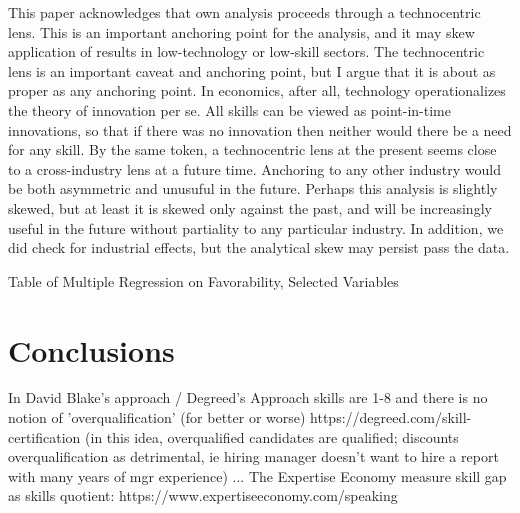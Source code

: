 \documentclass[review]{elsarticle}
\begin{document}
This paper acknowledges that own analysis proceeds through a technocentric lens.
This is an important anchoring point for the analysis, and it may skew application of results in low-technology or low-skill sectors.
The technocentric lens is an important caveat and anchoring point, but I argue that it is about as proper as any anchoring point.
In economics, after all, technology operationalizes the theory of innovation per se.
All skills can be viewed as point-in-time innovations, so that if there was no innovation then neither would there be a need for any skill.
By the same token, a technocentric lens at the present seems close to a cross-industry lens at a future time.
Anchoring to any other industry would be both asymmetric and unusuful in the future.
Perhaps this analysis is slightly skewed, but at least it is skewed only against the past, and will be increasingly useful in the future without partiality to any particular industry.
In addition, we did check for industrial effects, but the analytical skew may persist pass the data.



\begin{table}
    \caption{Table of Multiple Regression on Favorability, Selected Variables}
    \resizebox{\columnwidth}{!}{
        
    }
    \label{tab:table_new_ols}
\end{table}

\section{Conclusions}

In David Blake's approach / Degreed's Approach skills are 1-8 and there is no notion of 'overqualification' (for better or worse)
https://degreed.com/skill-certification
(in this idea, overqualified candidates are qualified; discounts overqualification as detrimental,
ie hiring manager doesn't want to hire a report with many years of mgr experience)
...
The Expertise Economy
measure skill gap as skills quotient: https://www.expertiseeconomy.com/speaking
\end{document}
